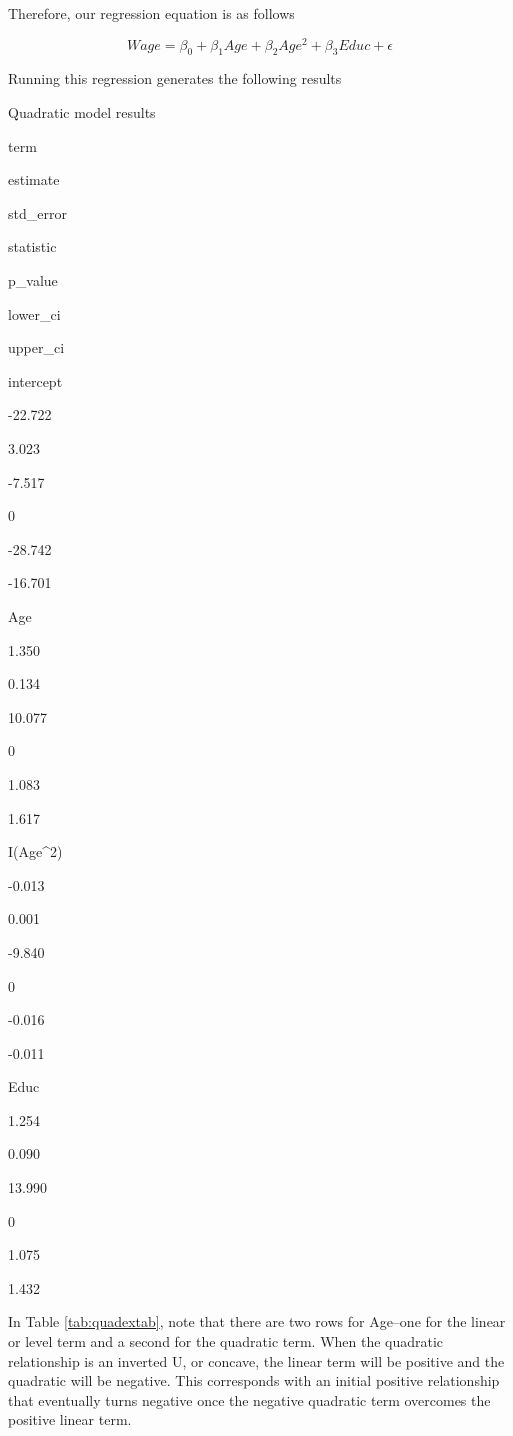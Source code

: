 \documentclass[
]{book}
\begin{document}
Therefore, our regression equation is as follows

\begin{equation}
Wage = \beta_0 + \beta_1Age + \beta_2Age^2 + \beta_3Educ + \epsilon
\label{eq:quadraticex}
\end{equation}

Running this regression generates the following results

\label{tab:quadextab}Quadratic model results

term

estimate

std\_error

statistic

p\_value

lower\_ci

upper\_ci

intercept

-22.722

3.023

-7.517

0

-28.742

-16.701

Age

1.350

0.134

10.077

0

1.083

1.617

I(Age\^{}2)

-0.013

0.001

-9.840

0

-0.016

-0.011

Educ

1.254

0.090

13.990

0

1.075

1.432

In Table \ref{tab:quadextab}, note that there are two rows for Age--one for the linear or level term and a second for the quadratic term. When the quadratic relationship is an inverted U, or concave, the linear term will be positive and the quadratic will be negative. This corresponds with an initial positive relationship that eventually turns negative once the negative quadratic term overcomes the positive linear term.
\end{document}
